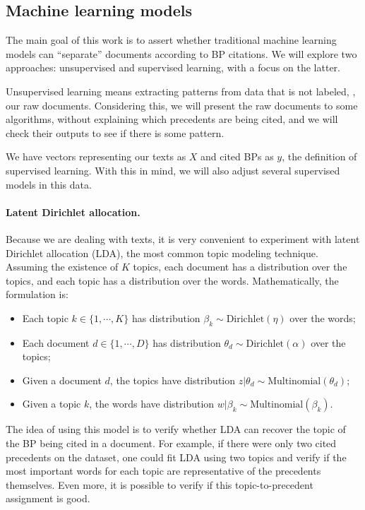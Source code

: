\subsection{Machine learning models}
    \label{sec:models}

    The main goal of this work is to assert whether traditional machine learning models can ``separate'' documents according to BP citations. We will explore two approaches: unsupervised and supervised learning, with a focus on the latter.

    Unsupervised learning means extracting patterns from data that is not labeled, \eg, our raw documents. Considering this, we will present the raw documents to some algorithms, without explaining which precedents are being cited, and we will check their outputs to see if there is some pattern.

    We have vectors representing our texts as $X$ and cited BPs as $y$, the definition of supervised learning. With this in mind, we will also adjust several supervised models in this data.

    \paragraph{Latent Dirichlet allocation.} Because we are dealing with texts, it is very convenient to experiment with latent Dirichlet allocation (LDA), the most common topic modeling technique. Assuming the existence of $K$ topics, each document has a distribution over the topics, and each topic has a distribution over the words. Mathematically, the formulation is:

    \begin{itemize}
            \item Each topic $k \in \{1, \cdots, K\}$ has distribution $\beta_k \sim \text{Dirichlet}(\eta)$ over the words;
            \item Each document $d \in \{1, \cdots, D\}$ has distribution $\theta_d \sim \text{Dirichlet}(\alpha)$ over the topics;
            \item Given a document $d$, the topics have distribution $z | \theta_d \sim \text{Multinomial}(\theta_d)$;
            \item Given a topic $k$, the words have distribution $w | \beta_k \sim \text{Multinomial}(\beta_k)$.
    \end{itemize}

    The idea of using this model is to verify whether LDA can recover the topic of the BP being cited in a document. For example, if there were only two cited precedents on the dataset, one could fit LDA using two topics and verify if the most important words for each topic are representative of the precedents themselves. Even more, it is possible to verify if this topic-to-precedent assignment is good.

